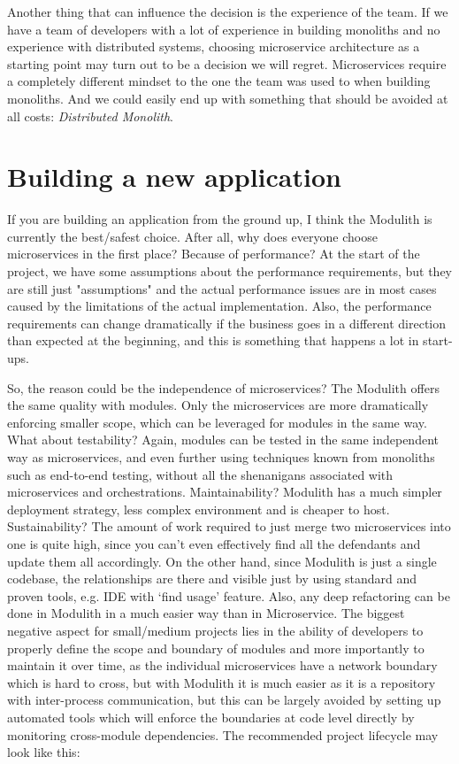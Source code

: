 Another thing that can influence the decision is the experience of the team. If we have a team of developers with a lot of experience in building monoliths and no experience with distributed systems, choosing microservice architecture as a starting point may turn out to be a decision we will regret. Microservices require a completely different mindset to the one the team was used to when building monoliths. And we could easily end up with something that should be avoided at all costs: \textit{Distributed Monolith}.

\section{Building a new application}
If you are building an application from the ground up, I think the Modulith is currently the best/safest choice. After all, why does everyone choose microservices in the first place? Because of performance? At the start of the project, we have some assumptions about the performance requirements, but they are still just "assumptions" and the actual performance issues are in most cases caused by the limitations of the actual implementation. Also, the performance requirements can change dramatically if the business goes in a different direction than expected at the beginning, and this is something that happens a lot in start-ups.

So, the reason could be the independence of microservices? The Modulith offers the same quality with modules. Only the microservices are more dramatically enforcing smaller scope, which can be leveraged for modules in the same way. What about testability? Again, modules can be tested in the same independent way as microservices, and even further using techniques known from monoliths such as end-to-end testing, without all the shenanigans associated with microservices and orchestrations. Maintainability? Modulith has a much simpler deployment strategy, less complex environment and is cheaper to host. Sustainability? The amount of work required to just merge two microservices into one is quite high, since you can't even effectively find all the defendants and update them all accordingly. On the other hand, since Modulith is just a single codebase, the relationships are there and visible just by using standard and proven tools, e.g. IDE with `find usage' feature. Also, any deep refactoring can be done in Modulith in a much easier way than in Microservice. The biggest negative aspect for small/medium projects lies in the ability of developers to properly define the scope and boundary of modules and more importantly to maintain it over time, as the individual microservices have a network boundary which is hard to cross, but with Modulith it is much easier as it is a repository with inter-process communication, but this can be largely avoided by setting up automated tools which will enforce the boundaries at code level directly by monitoring cross-module dependencies. The recommended project lifecycle may look like this:

